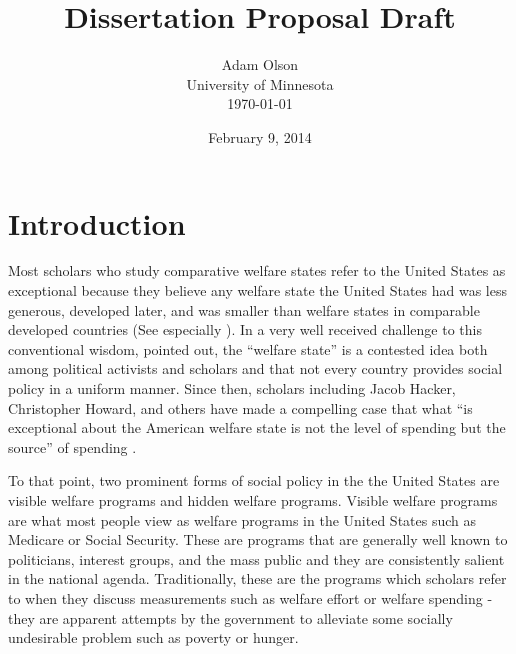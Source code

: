 \documentclass[12pt]{article}
\author{Adam Olson\\University of Minnesota\\ \today}
\title{Dissertation Proposal Draft}
\date{February 9, 2014}
\makeatletter
\renewcommand{\maketitle}{\bgroup\setlength{\parindent}{0pt}
\begin{flushleft}
  \textbf{\@title}

  \@author
\end{flushleft}\egroup
}
\makeatother
\begin{document}
\maketitle

\section{Introduction}
Most scholars who study comparative welfare states refer to the United States as exceptional because they believe any welfare state the United States had was less generous, developed later, and was smaller than welfare states in comparable developed countries (See especially \citealt{andersen1990}). In a very well received challenge to this conventional wisdom, \citet{hacker2002} pointed out, the ``welfare state'' is a contested idea both among political activists and scholars and that not every country provides social policy in a uniform manner. Since then, scholars including Jacob Hacker, Christopher Howard, and others have made a compelling case that what ``is exceptional about the American welfare state is not the level of spending but the source'' of spending \citep[pg. 7]{hacker2002}.

To that point, two prominent forms of social policy in the the United States are visible welfare programs and hidden welfare programs. Visible welfare programs are what most people view as welfare programs in the United States such as Medicare or Social Security. These are programs that are generally well known to politicians, interest groups, and the mass public and they are consistently salient in the national agenda. Traditionally, these are the programs which scholars refer to when they discuss measurements such as welfare effort or welfare spending - they are apparent attempts by the government to alleviate some socially undesirable problem such as poverty or hunger.
\end{document}
